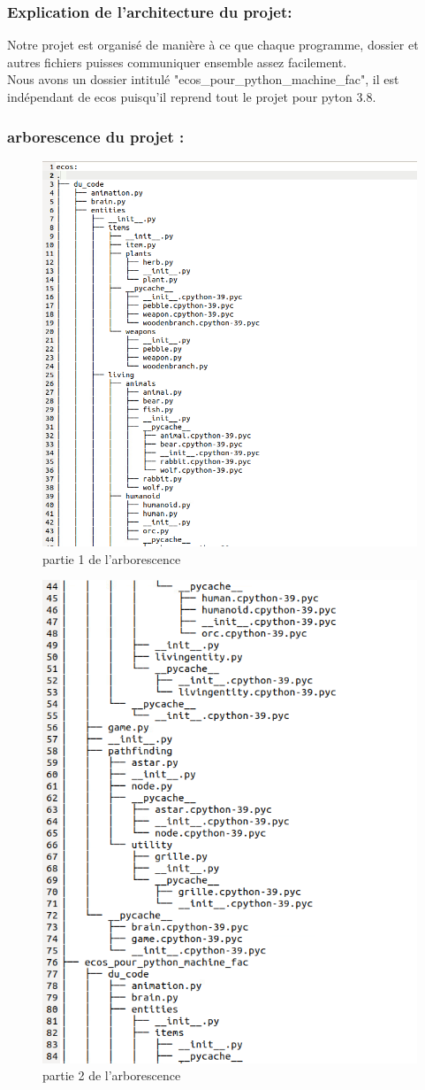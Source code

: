 \documentclass[a4paper, 11pt]{article}
\begin{document}
\subsubsection{Explication de l'architecture du projet:}
Notre projet est organisé de manière à ce que chaque programme, dossier et autres fichiers puisses communiquer ensemble assez facilement.\\
Nous avons un dossier intitulé "ecos\_pour\_python\_machine\_fac", il est indépendant de ecos puisqu'il reprend tout le projet pour pyton 3.8.\\
\newpage

\subsubsection{arborescence du projet :}
\begin{figure}[ht!]
 \centering
 \includegraphics[width=0.5\linewidth]{images/arborecsens/arbrepart1.png}
 \caption{partie 1 de l'arborescence}
 \label{fig::example::one}
\end{figure}
\begin{figure}[ht!]
 \centering
 \includegraphics[width=0.5\linewidth]{images/arborecsens/arbrepart2.png}
 \caption{partie 2 de l'arborescence}
 \label{fig::example::one}
\end{figure}
\end{document}
